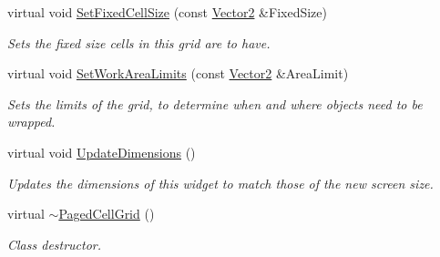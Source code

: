 \begin{DoxyCompactItemize}
virtual void \hyperlink{classMezzanine_1_1UI_1_1PagedCellGrid_a32cdd1fc050fb926db8bdd03d419841e}{SetFixedCellSize} (const \hyperlink{classMezzanine_1_1Vector2}{Vector2} \&FixedSize)
\begin{DoxyCompactList}\small\item\em Sets the fixed size cells in this grid are to have. \item\end{DoxyCompactList}\item 
virtual void \hyperlink{classMezzanine_1_1UI_1_1PagedCellGrid_ad5cf298943ad2e8517d7660bffbe5744}{SetWorkAreaLimits} (const \hyperlink{classMezzanine_1_1Vector2}{Vector2} \&AreaLimit)
\begin{DoxyCompactList}\small\item\em Sets the limits of the grid, to determine when and where objects need to be wrapped. \item\end{DoxyCompactList}\item 
virtual void \hyperlink{classMezzanine_1_1UI_1_1PagedCellGrid_a1ff79a778710a517abb5c55a13b6a273}{UpdateDimensions} ()
\begin{DoxyCompactList}\small\item\em Updates the dimensions of this widget to match those of the new screen size. \item\end{DoxyCompactList}\item 
\hypertarget{classMezzanine_1_1UI_1_1PagedCellGrid_a2ca41cf2126edae60b2528c50befa2dd}{
virtual \hyperlink{classMezzanine_1_1UI_1_1PagedCellGrid_a2ca41cf2126edae60b2528c50befa2dd}{$\sim$PagedCellGrid} ()}
\label{classMezzanine_1_1UI_1_1PagedCellGrid_a2ca41cf2126edae60b2528c50befa2dd}

\begin{DoxyCompactList}\small\item\em Class destructor. \item\end{DoxyCompactList}\end{DoxyCompactItemize}
